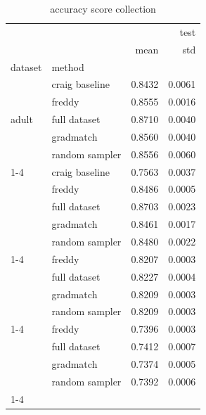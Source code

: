 \begin{table}\label{tab:accurace}
\caption{accuracy score collection}
\centering
\begin{tabular}{llrr}
\toprule
 &  & \multicolumn{2}{r}{test} \\
 &  & mean & std \\
dataset & method &  &  \\
\midrule
\multirow[t]{5}{*}{adult} & craig baseline & 0.8432 & 0.0061 \\
 & freddy & 0.8555 & 0.0016 \\
 & full dataset & 0.8710 & 0.0040 \\
 & gradmatch & 0.8560 & 0.0040 \\
 & random sampler & 0.8556 & 0.0060 \\
\cline{1-4}
\multirow[t]{5}{*}{covtype} & craig baseline & 0.7563 & 0.0037 \\
 & freddy & 0.8486 & 0.0005 \\
 & full dataset & 0.8703 & 0.0023 \\
 & gradmatch & 0.8461 & 0.0017 \\
 & random sampler & 0.8480 & 0.0022 \\
\cline{1-4}
\multirow[t]{4}{*}{hepmass} & freddy & 0.8207 & 0.0003 \\
 & full dataset & 0.8227 & 0.0004 \\
 & gradmatch & 0.8209 & 0.0003 \\
 & random sampler & 0.8209 & 0.0003 \\
\cline{1-4}
\multirow[t]{4}{*}{higgs} & freddy & 0.7396 & 0.0003 \\
 & full dataset & 0.7412 & 0.0007 \\
 & gradmatch & 0.7374 & 0.0005 \\
 & random sampler & 0.7392 & 0.0006 \\
\cline{1-4}
\bottomrule
\end{tabular}
\end{table}
